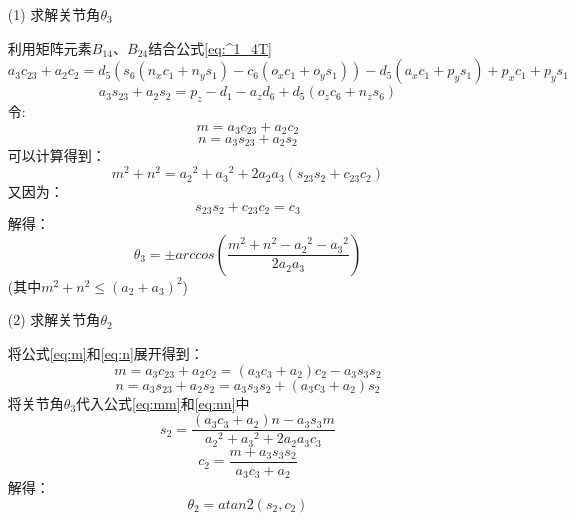 \documentclass{seuthesis-2022}
\numberwithin{equation}{section}
\begin{document}
\begin{itemize}
  \item [(1)]
  求解关节角$\theta_3$
  
  利用矩阵元素$B_{14}$、$B_{24}$结合公式\eqref{eq:^1_4T}
  \begin{equation}
    a_3c_{23}+a_2c_2 = d_5\left(s_6(n_xc_1+n_ys_1)-c_6(o_xc_1+o_ys_1)\right) - d_5(a_xc_1+p_ys_1) + p_xc_1 + p_ys_1
  \end{equation}
  \begin{equation}
    a_3s_{23}+a_2s_2 = p_z-d_1-a_zd_6 +d_5(o_zc_6+n_zs_6)
  \end{equation}
  令:
  \begin{equation}\label{eq:m}
    m=a_3c_{23}+a_2c_2
  \end{equation}
  \begin{equation}\label{eq:n}
    n=a_3s_{23}+a_2s_2
  \end{equation}
  可以计算得到：
  \begin{equation}
    m^2+n^2 = {a_2}^2+{a_3}^2+2a_2a_3(s_{23}s_2+c_{23}c_2)
  \end{equation}
  又因为：
  \begin{equation}
    s_{23}s_2+c_{23}c_2 = c_3
  \end{equation}
  解得：
  \begin{equation}
    \theta_3 = \pm arccos(\frac{m^2+n^2-{a_2}^2-{a_3}^2}{2a_2a_3})
  \end{equation}
  (其中$m^2+n^2 \leq (a_2+a_3)^2$)
  \item [(2)]
  求解关节角$\theta_2$
  
  将公式\eqref{eq:m}和\eqref{eq:n}展开得到：
  \begin{equation}\label{eq:mm}
    m=a_3c_{23}+a_2c_2=(a_3c_3+a_2)c_2-a_3s_3s_2
  \end{equation}
  \begin{equation}\label{eq:nn}
    n=a_3s_{23}+a_2s_2=a_3s_3s_2+(a_3c_3+a_2)s_2
  \end{equation}
  将关节角$\theta_3$代入公式\eqref{eq:mm}和\eqref{eq:nn}中
  \begin{equation}
    s_2 = \frac{(a_3c_3+a_2)n-a_3s_3m}{{a_2}^2+{a_3}^2+2a_2a_3c_3}
  \end{equation}
  \begin{equation}
    c_2 = \frac{m+a_3s_3s_2}{a_3c_3+a_2}
  \end{equation}
  解得：
  \begin{equation}
    \theta_2 = atan2(s_2,c_2)
  \end{equation}


\end{itemize}
\end{document}

